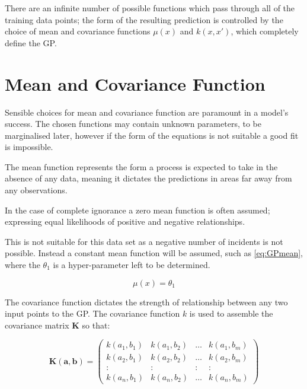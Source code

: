 \documentclass[a4paper,11pt]{report}
\begin{document}
There are an infinite number of possible functions which pass through all of the training data points; the form of the resulting prediction is controlled by the choice of mean and covariance functions \(\mu (x)\) and \( k(x,x')\), which completely define the GP.

\section{Mean and Covariance Function}

Sensible choices for mean and covariance function are paramount in a model's success. The chosen functions may contain unknown parameters, to be marginalised later, however if the form of the equations is not suitable a good fit is impossible. \\ \par

The mean function represents the form a process is expected to take in the absence of any data, meaning it dictates the predictions in areas far away from any observations.

In the case of complete ignorance a zero mean function is often assumed; expressing equal likelihoods of positive and negative relationships. 

This is not suitable for this data set as a negative number of incidents is not possible. Instead a constant mean function will be assumed, such as \ref{eq:GPmean}, where the \(\theta_1\) is a hyper-parameter left to be determined.

\begin{equation} \label{eq:GPmean}
\mu (x) = \theta_1
\end{equation}

The covariance function dictates the strength of relationship between any two input points to the GP. The covariance function \(k\) is used to assemble the covariance matrix \(\mathbf{K}\) so that: 

\begin{equation}
\mathbf{K(a,b)} =  \left( \begin{array}{cccc}
k(a_1,b_1) & k(a_1,b_2) &  \dots & k(a_1,b_m) \\
k(a_2,b_1) & k(a_2,b_2) &  \dots & k(a_2,b_m) \\
: & : & : & : \\
k(a_n,b_1) & k(a_n,b_2) &  \dots & k(a_n,b_m)  \end{array} \right) 
\end{equation}
\end{document}
